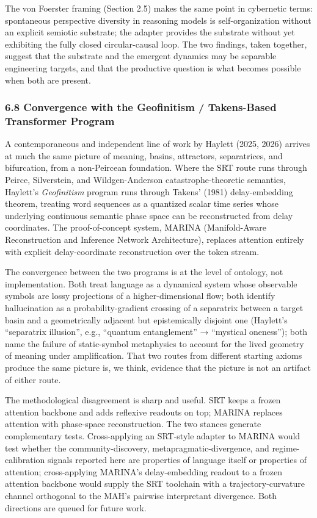 \documentclass[
  11pt]{article}
\begin{document}
The von Foerster framing (Section 2.5) makes the same point in
cybernetic terms: spontaneous perspective diversity in reasoning models
is self-organization without an explicit semiotic substrate; the adapter
provides the substrate without yet exhibiting the fully closed
circular-causal loop. The two findings, taken together, suggest that the
substrate and the emergent dynamics may be separable engineering
targets, and that the productive question is what becomes possible when
both are present.

\subsubsection{6.8 Convergence with the Geofinitism / Takens-Based
Transformer
Program}\label{convergence-with-the-geofinitism-takens-based-transformer-program}

A contemporaneous and independent line of work by Haylett (2025, 2026)
arrives at much the same picture of meaning, basins, attractors,
separatrices, and bifurcation, from a non-Peircean foundation. Where the
SRT route runs through Peirce, Silverstein, and Wildgen-Anderson
catastrophe-theoretic semantics, Haylett's \emph{Geofinitism} program
runs through Takens' (1981) delay-embedding theorem, treating word
sequences as a quantized scalar time series whose underlying continuous
semantic phase space can be reconstructed from delay coordinates. The
proof-of-concept system, MARINA (Manifold-Aware Reconstruction and
Inference Network Architecture), replaces attention entirely with
explicit delay-coordinate reconstruction over the token stream.

The convergence between the two programs is at the level of ontology,
not implementation. Both treat language as a dynamical system whose
observable symbols are lossy projections of a higher-dimensional flow;
both identify hallucination as a probability-gradient crossing of a
separatrix between a target basin and a geometrically adjacent but
epistemically disjoint one (Haylett's ``separatrix illusion'', e.g.,
``quantum entanglement'' → ``mystical oneness''); both name the failure
of static-symbol metaphysics to account for the lived geometry of
meaning under amplification. That two routes from different starting
axioms produce the same picture is, we think, evidence that the picture
is not an artifact of either route.

The methodological disagreement is sharp and useful. SRT keeps a frozen
attention backbone and adds reflexive readouts on top; MARINA replaces
attention with phase-space reconstruction. The two stances generate
complementary tests. Cross-applying an SRT-style adapter to MARINA would
test whether the community-discovery, metapragmatic-divergence, and
regime-calibration signals reported here are properties of language
itself or properties of attention; cross-applying MARINA's
delay-embedding readout to a frozen attention backbone would supply the
SRT toolchain with a trajectory-curvature channel orthogonal to the
MAH's pairwise interpretant divergence. Both directions are queued for
future work.
\end{document}
